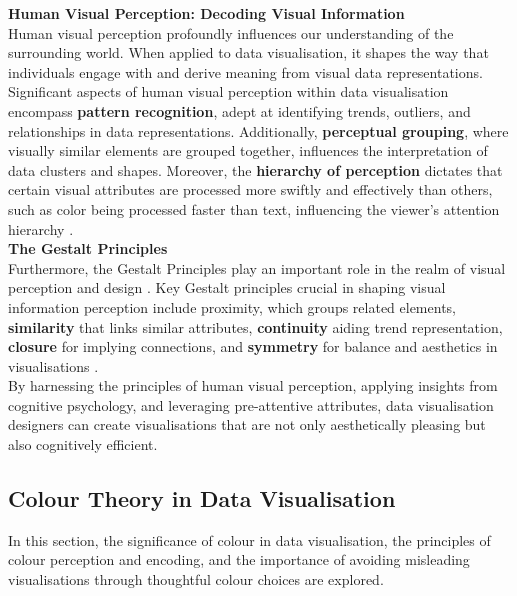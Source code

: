 \documentclass{article}\usepackage[]{graphicx}\usepackage[]{xcolor}
\numberwithin{equation}{section}
\begin{document}
\noindent \textbf{Human Visual Perception: Decoding Visual Information}\\
Human visual perception profoundly influences our understanding of the surrounding world. When applied to data visualisation, it shapes the way that individuals engage with and derive meaning from visual data representations.\\

\noindent 
Significant aspects of human visual perception within data visualisation encompass \textbf{pattern recognition}, adept at identifying trends, outliers, and relationships in data representations. Additionally, \textbf{perceptual grouping}, where visually similar elements are grouped together, influences the interpretation of data clusters and shapes. Moreover, the \textbf{hierarchy of perception} dictates that certain visual attributes are processed more swiftly and effectively than others, such as color being processed faster than text, influencing the viewer's attention hierarchy \cite{dastani2002role}.\\

\noindent \textbf{The Gestalt Principles }\\
Furthermore, the Gestalt Principles play an important role in the realm of visual perception and design \cite{rosli2015gestalt}. Key Gestalt principles crucial in shaping visual information perception include proximity, which groups related elements, \textbf{similarity} that links similar attributes, \textbf{continuity} aiding trend representation, \textbf{closure} for implying connections, and \textbf{symmetry} for balance and aesthetics in visualisations \cite{todorovic2008gestalt}. \\

\noindent By harnessing the principles of human visual perception, applying insights from cognitive psychology, and leveraging pre-attentive attributes, data visualisation designers can create visualisations that are not only aesthetically pleasing but also cognitively efficient.	


\subsection{Colour Theory in Data Visualisation}
In this section, the significance of colour in data visualisation, the principles of colour perception and encoding, and the importance of avoiding misleading visualisations through thoughtful colour choices are explored.\\
\end{document}
